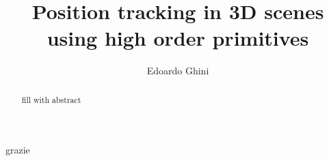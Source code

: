 \documentclass[LaM,binding=0.6cm]{sapthesis}
\title{Position tracking in 3D scenes using high order primitives}
\author{Edoardo Ghini}
\begin{document}
\frontmatter

\maketitle

\dedication{Dedicated to nessuno}

\begin{abstract}
 fill with abstract 
\end{abstract}

\begin{acknowledgments}
  grazie
\end{acknowledgments}

\tableofcontents






\mainmatter







\backmatter
\end{document}
